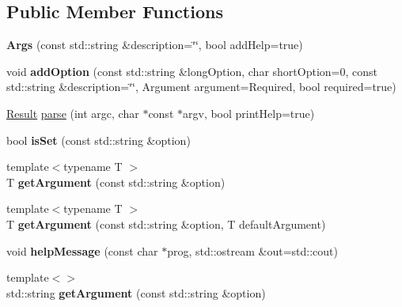 \subsection*{Public Member Functions}
\begin{DoxyCompactItemize}
\item 
\hypertarget{classtools_1_1Args_ac990064dc296955154be98d98acd46b9}{{\bfseries Args} (const std\-::string \&description=\char`\"{}\char`\"{}, bool add\-Help=true)}\label{classtools_1_1Args_ac990064dc296955154be98d98acd46b9}

\item 
\hypertarget{classtools_1_1Args_a10d5693fa13e60f9da62dcd8696c150d}{void {\bfseries add\-Option} (const std\-::string \&long\-Option, char short\-Option=0, const std\-::string \&description=\char`\"{}\char`\"{}, Argument argument=Required, bool required=true)}\label{classtools_1_1Args_a10d5693fa13e60f9da62dcd8696c150d}

\item 
\hyperlink{classtools_1_1Args_ae0b38617134893616df504e543ba6e6e}{Result} \hyperlink{classtools_1_1Args_a9d8751d3ca13ddf37d390f42384ba49a}{parse} (int argc, char $\ast$const $\ast$argv, bool print\-Help=true)
\item 
\hypertarget{classtools_1_1Args_a73558f89ba2c7592c0bbb5c29bee228c}{bool {\bfseries is\-Set} (const std\-::string \&option)}\label{classtools_1_1Args_a73558f89ba2c7592c0bbb5c29bee228c}

\item 
\hypertarget{classtools_1_1Args_ab21287411ac81cd228184ee520267851}{{\footnotesize template$<$typename T $>$ }\\T {\bfseries get\-Argument} (const std\-::string \&option)}\label{classtools_1_1Args_ab21287411ac81cd228184ee520267851}

\item 
\hypertarget{classtools_1_1Args_a6247cd94f3bc79ce2a120777caeaea7c}{{\footnotesize template$<$typename T $>$ }\\T {\bfseries get\-Argument} (const std\-::string \&option, T default\-Argument)}\label{classtools_1_1Args_a6247cd94f3bc79ce2a120777caeaea7c}

\item 
\hypertarget{classtools_1_1Args_a8e805f57e66ed5407fe3762b8409d685}{void {\bfseries help\-Message} (const char $\ast$prog, std\-::ostream \&out=std\-::cout)}\label{classtools_1_1Args_a8e805f57e66ed5407fe3762b8409d685}

\item 
\hypertarget{classtools_1_1Args_ab9c570cfa217f4694ac801de1e835351}{{\footnotesize template$<$$>$ }\\std\-::string {\bfseries get\-Argument} (const std\-::string \&option)}\label{classtools_1_1Args_ab9c570cfa217f4694ac801de1e835351}

\end{DoxyCompactItemize}


